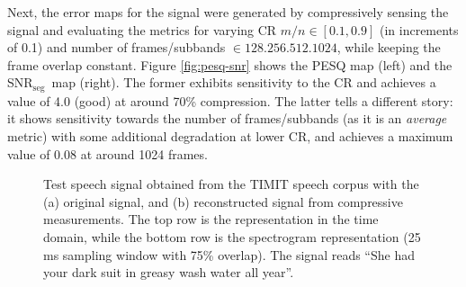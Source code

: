 \documentclass[10pt,a4paper,twoside]{article}
\newcommand{\snrseg}{SNR$_{\mathrm{seg}}$}
\begin{document}
Next, the error maps for the signal were generated by compressively sensing the signal and evaluating the metrics for varying CR $m/n \in [0.1, 0.9]$ (in increments of 0.1) and number of frames/subbands $\in \qty{128, 256, 512, 1024}$, while keeping the frame overlap constant. Figure \ref{fig:pesq-snr} shows the PESQ map (left) and the \snrseg~map (right). The former exhibits sensitivity to the CR and achieves a value of 4.0 (good) at around 70\% compression. The latter tells a different story: it shows sensitivity towards the number of frames/subbands (as it is an \textit{average} metric) with some additional degradation at lower CR, and achieves a maximum value of 0.08 at around 1024 frames.


\begin{figure}[tbp]
	\centering
	\quad %
	\caption{Test speech signal obtained from the TIMIT speech corpus with the (a) original signal, and (b) reconstructed signal from compressive measurements. The top row is the representation in the time domain, while the bottom row is the spectrogram representation (25 ms sampling window with 75\% overlap). The signal reads ``She had your dark suit in greasy wash water all year''.}\label{fig:spectrogram}
\end{figure}
\end{document}
